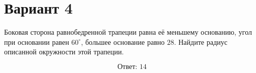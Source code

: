 \documentclass[12pt,a4paper]{article}
\begin{document}
\section*{Вариант 4}

Боковая сторона равнобедренной трапеции равна её меньшему основанию,
угол при основании равен \(60^\circ\), большее основание равно \(28\).
Найдите радиус описанной окружности этой трапеции.

\begin{center}\figIsoscelesTrapezoidCircle\end{center}

\[
\boxed{\text{Ответ: }14}
\]
\end{document}
